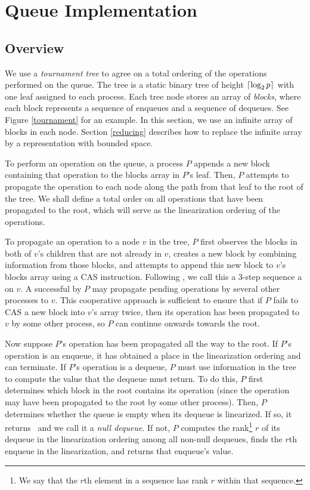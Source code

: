 
\section{Queue Implementation} \label{DescriptQ}

\subsection{Overview}
We use a \emph{tournament tree} to agree on a total ordering of the operations performed on the queue.
The tree is a static binary tree of height $\lceil \log_2 p \rceil$ with one leaf 
assigned to each process. 
Each tree node  stores an array of \emph{blocks}, where each block represents a 
sequence of enqueues and a sequence of dequeues.
See Figure \ref{tournament} for an example.
In this section, we use an infinite array of blocks in each node.
Section \ref{reducing} describes how to replace the infinite array by a representation with bounded space.

To perform an operation on the queue, a process $P$ appends a new block containing that  
operation to the blocks array in $P$'s leaf.
Then, $P$ attempts to propagate the operation to each node along the path from that leaf to the root of the tree.
We shall define a total order on all operations that have been propagated to the root, which 
will serve as the linearization ordering of the operations.

To propagate an operation to a node $v$ in the tree, $P$ first observes
the blocks in both of $v$'s children that are not already in $v$,
creates a new block by combining information from those blocks, and attempts to append this 
new block to $v$'s blocks array using a CAS instruction.
Following \cite{}, we call this a 3-step sequence a
 on $v$. %
A successful  by $P$ may propagate pending operations by several other processes to $v$.
This cooperative approach is sufficient to ensure that if $P$ fails to CAS a 
new block into $v$'s array twice,
then its operation has been propagated to $v$ by some other process, so $P$ can continue 
onwards towards the root.

Now suppose $P$'s operation has been propagated all the way to the root.
If $P$'s operation is an enqueue, it has obtained a place in the linearization ordering and can terminate.
If $P$'s operation is a dequeue, $P$ must use information in the tree to compute the value that the
dequeue must return.  To do this, $P$ first determines which block in the root contains its operation
(since the operation may have been propagated to the root by some other process).
Then, $P$ determines whether the queue is empty when its dequeue is linearized. 
If so, it returns \nl\ and we call it a \emph{null dequeue}.
If not, $P$ computes the rank\footnote{We say that the $r$th element in a sequence has rank $r$ within that sequence.} $r$ of its dequeue in the linearization ordering
among all non-null dequeues,
finds the $r$th enqueue in the linearization, and returns that enqueue's value.

